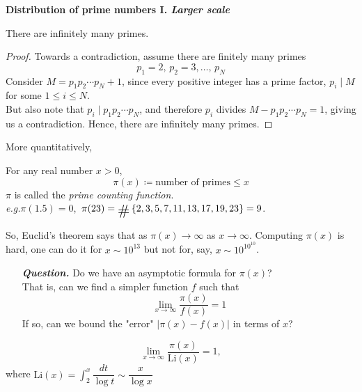 \vspace{1em}

{\bf\large Distribution of prime numbers I. \emph{Larger scale}}
\vspace*{0.5em}
\begin{theorem}[Euclid]
There are infinitely many primes.
\end{theorem}
\begin{proof}
Towards a contradiction, assume there are finitely many primes
\[p_1 = 2,\, p_2 = 3,\ldots,\,p_N\]
Consider $M = p_1p_2\cdots p_N + 1$, since every positive integer has a prime factor, $p_i \mid M$ for some $1\leq i \leq N$.\\[0.5em]
But also note that $p_i \mid p_1p_2\cdots p_N$, and therefore $p_i$ divides $M - p_1p_2\cdots p_N = 1$, giving us a contradiction. Hence, there are infinitely many primes.
\end{proof}

\vspace*{2.5em}

More quantitatively,
\begin{definition}
For any real number $x>0$,
\[\pi(x) \coloneqq \text{number of primes} \leq x\]
$\pi$ is called the \emph{prime counting function}.
\vspace*{1em}\\
\emph{e.g.}\quad $\pi(1.5) = 0$,\ $\pi(23) = \card\set{2,3,5,7,11,13,17,19,23} = 9$.
\end{definition}

\vspace*{2em}

So, Euclid's theorem says that as $\pi(x) \to \infty$ as $x \to \infty$. Computing $\pi(x)$ is hard, one can do it for $x \sim 10^{13}$ but not for, say, $x \sim 10^{10^{10}}$.\\[1em]
\begin{itemize}[leftmargin=4.8em]
\item[\emph{\textbf{Question.}}] Do we have an asymptotic formula for $\pi(x)$?\\[0.5em]
That is, can we find a simpler function $f$ such that 
\[\lim_{x\to \infty}\frac{\pi(x)}{f(x)} = 1\]
If so, can we bound the "error" $|\pi(x) - f(x)|$ in terms of $x$?
\end{itemize}

\vspace*{1em}

\begin{theorem}
\[\lim_{x \to \infty}\frac{\pi(x)}{\mathrm{Li}(x)} = 1,\]
where $\displaystyle \mathrm{Li}(x) = \int_2^x \dfrac{dt}{\log t} \sim \dfrac{x}{\log x}$
\end{theorem}

